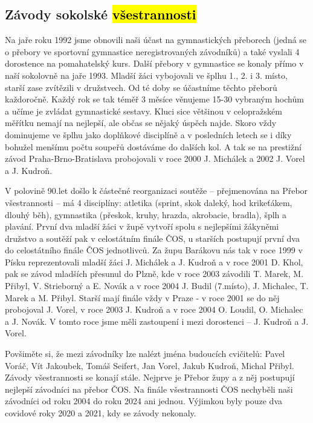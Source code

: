 \subsection{\texorpdfstring{Závody sokolské
\hl{všestrannosti}}{Závody sokolské všestrannosti}}\label{zuxe1vody-sokolskuxe9-vux161estrannosti}

Na jaře roku 1992 jsme obnovili naši účast na gymnastických přeborech
(jedná se o přebory ve sportovní gymnastice neregistrovaných závodníků)
a také vyslali 4 dorostence na pomahatelský kurs. Další přebory v
gymnastice se konaly přímo v naší sokolovně na jaře 1993. Mladší žáci
vybojovali ve šplhu 1., 2. i 3. místo, starší zase zvítězili v
družstvech. Od té doby se účastníme těchto přeborů každoročně. Každý rok
se tak téměř 3 měsíce věnujeme 15-30 vybraným hochům a učíme je zvládat
gymnastické sestavy. Kluci sice většinou v celopražském měřítku nemají
na nejlepší, ale občas se nějaký úspěch najde. Skoro vždy dominujeme ve
šplhu jako doplňkové disciplíně a v posledních letech se i díky bohužel
menšímu počtu soupeřů dostáváme do dalších kol. A tak se na prestižní
závod Praha-Brno-Bratislava probojovali v roce 2000 J. Michálek a 2002
J. Vorel a J. Kudroň.

V polovině 90.let došlo k částečné reorganizaci soutěže -- přejmenována
na Přebor všestrannosti -- má 4 disciplíny: atletika (sprint, skok
daleký, hod krikeťákem, dlouhý běh), gymnastika (přeskok, kruhy, hrazda,
akrobacie, bradla), šplh a plavání. První dva mladší žáci v župě vytvoří
spolu s nejlepšími žákyněmi družstvo a soutěží pak v celostátním finále
ČOS, u starších postupují první dva do celostátního finále ČOS
jednotlivců. Za župu Barákovu nás tak v roce 1999 v Písku reprezentovali
mladší žáci J. Michálek a J. Kudroň a v roce 2001 D. Khol, pak se závod
mladších přesunul do Plzně, kde v roce 2003 závodili T. Marek, M.
Přibyl, V. Strieborný a E. Novák a v roce 2004 J. Budil (7.místo), J.
Michalec, T. Marek a M. Přibyl. Starší mají finále vždy v Praze - v roce
2001 se do něj probojoval J. Vorel, v roce 2003 J. Kudroň a v roce 2004
O. Loudil, O. Michalec a J. Novák. V tomto roce jsme měli zastoupení i
mezi dorostenci -- J. Kudroň a J. Vorel.

Povšiměte si, že mezi závodníky lze nalézt jména budoucích cvičitelů:
Pavel Voráč, Vít Jakoubek, Tomáš Seifert, Jan Vorel, Jakub Kudroň,
Michal Přibyl. Závody všestrannosti se konají stále. Nejprve je Přebor
župy a z něj postupují nejlepší závodníci na přebor ČOS. Na finále
všestrannosti ČOS nechyběli naši závodníci od roku 2004 do roku 2024 ani
jednou. Výjimkou byly pouze dva covidové roky 2020 a 2021, kdy se závody
nekonaly.

